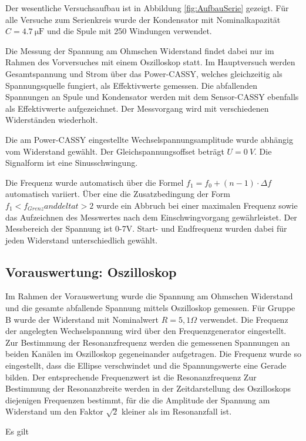 \documentclass[12pt,a4paper]{article}
\begin{document}
Der wesentliche Versuchsaufbau ist in Abbildung \ref{fig:AufbauSerie} gezeigt. Für alle Versuche zum Serienkreis wurde der Kondensator mit Nominalkapazität $C=\SI{4,7}{\micro \F}$ und die Spule mit 250 Windungen verwendet.

Die Messung der Spannung am Ohmschen Widerstand findet dabei nur im Rahmen des Vorversuches mit einem Oszilloskop statt.
Im Hauptversuch werden Gesamtspannung und Strom über das Power-CASSY, welches gleichzeitig als Spannungsquelle fungiert, als Effektivwerte gemessen. Die abfallenden Spannungen an Spule und Kondensator werden mit dem Sensor-CASSY ebenfalls als Effektivwerte aufgezeichnet. Der Messvorgang wird mit verschiedenen Widerständen wiederholt.

Die am Power-CASSY eingestellte Wechselspannungsamplitude wurde abhängig vom Widerstand gewählt. Der Gleichspannungsoffset beträgt $U = \SI{0}{V}$. Die Signalform ist eine Sinusschwingung.

Die Frequenz wurde automatisch über die Formel $f_1 = f_0 +(n-1) \cdot \Delta f$ automatisch variiert. Über eine die Zusatzbedingung der Form$f_1 < f_{Grenz} and delta t > 2$ wurde ein Abbruch bei einer maximalen Frequenz sowie das Aufzeichnen des Messwertes nach dem Einschwingvorgang gewährleistet. Der Messbereich der Spannung ist 0-7V. Start- und Endfrequenz wurden dabei für jeden Widerstand unterschiedlich gewählt.

\subsection{Vorauswertung: Oszilloskop}
Im Rahmen der Vorauswertung wurde die Spannung am Ohmschen Widerstand und die gesamte abfallende Spannung mittels Oszilloskop gemessen. Für Gruppe B wurde der Widerstand mit Nominalwert $R = 5,1 \Omega$ verwendet. Die Frequenz der angelegten Wechselspannung wird über den Frequenzgenerator eingestellt.\\

Zur Bestimmung der Resonanzfrequenz werden die gemessenen Spannungen an beiden Kanälen im Oszilloskop gegeneinander aufgetragen. Die Frequenz wurde so eingestellt, dass die Ellipse verschwindet und die Spannungswerte eine Gerade bilden. Der entsprechende Frequenzwert ist die Resonanzfrequenz
Zur Bestimmung der Resonanzbreite werden in der Zeitdarstellung des Oszilloskops diejenigen Frequenzen bestimmt, für die die Amplitude der Spannung am Widerstand um den Faktor $\sqrt{2}$ kleiner als im Resonanzfall ist. 

Es gilt
\end{document}
